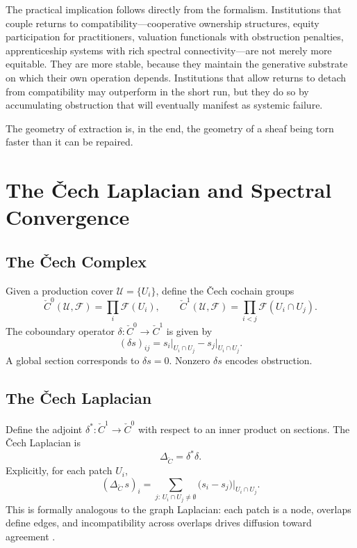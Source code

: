\documentclass[12pt]{article}
\begin{document}
The practical implication follows directly from the formalism. Institutions that couple returns to compatibility---cooperative ownership structures, equity participation for practitioners, valuation functionals with obstruction penalties, apprenticeship systems with rich spectral connectivity---are not merely more equitable. They are more stable, because they maintain the generative substrate on which their own operation depends. Institutions that allow returns to detach from compatibility may outperform in the short run, but they do so by accumulating obstruction that will eventually manifest as systemic failure.

The geometry of extraction is, in the end, the geometry of a sheaf being torn faster than it can be repaired.


\newpage
\appendix

\section{The \v{C}ech Laplacian and Spectral Convergence}

\subsection{The \v{C}ech Complex}

Given a production cover $\mathcal{U} = \{U_i\}$, define the \v{C}ech cochain groups
\[
\check{C}^0(\mathcal{U}, \mathcal{F}) = \prod_i \mathcal{F}(U_i),
\qquad
\check{C}^1(\mathcal{U}, \mathcal{F}) = \prod_{i<j} \mathcal{F}(U_i \cap U_j).
\]
The coboundary operator $\delta: \check{C}^0 \to \check{C}^1$ is given by
\[
(\delta s)_{ij} = s_i\big|_{U_i \cap U_j} - s_j\big|_{U_i \cap U_j}.
\]
A global section corresponds to $\delta s = 0$. Nonzero $\delta s$ encodes obstruction.

\subsection{The \v{C}ech Laplacian}

Define the adjoint $\delta^\ast: \check{C}^1 \to \check{C}^0$ with respect to an inner product on sections. The \v{C}ech Laplacian is
\[
\Delta_{\check{C}} = \delta^\ast \delta.
\]
Explicitly, for each patch $U_i$,
\[
(\Delta_{\check{C}}\, s)_i = \sum_{j:\, U_i \cap U_j \neq \emptyset} \bigl(s_i - s_j\bigr)\big|_{U_i \cap U_j}.
\]
This is formally analogous to the graph Laplacian: each patch is a node, overlaps define edges, and incompatibility across overlaps drives diffusion toward agreement \cite{Simon1962}.
\end{document}
